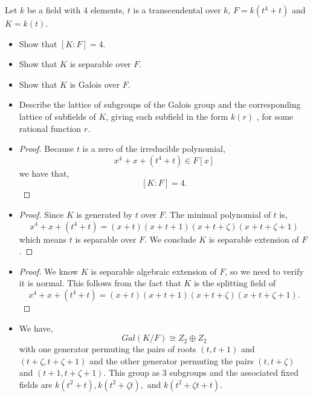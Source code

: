 \documentclass[11pt]{article}
\newenvironment{problem}[2][Problem\!]{\begin{tcolorbox}\begin{trivlist}
\item[\hskip \labelsep {\bfseries #1}\hskip \labelsep {\bfseries #2}]}{\end{trivlist}\end{tcolorbox}}
\begin{document}
\vspace*{15pt}

\begin{problem} {14.9.7}
    Let $k$ be a field with 4 elements, $t$ is a transcendental over $k$, $F = k(t^{4} + t)$ and $K = k(t)$. 
    \begin{itemize}
        \item[(a)] Show that $[K:F] = 4$.
        \item[(b)] Show that $K$ is separable over $F$.
        \item[(c)] Show that $K$ is Galois over $F$.
        \item[(d)] Describe the lattice of subgroups of the Galois group and the corresponding lattice of subfields of $K$, giving each subfield in the form $k(r)$ , for some rational function $r$.   
    \end{itemize}
\end{problem}
\begin{itemize}
    \item[(a)]
    \begin{proof}
        Because $t$ is a zero of the irreducible polynomial,
        \[x^{4} +x + (t^{4} +t)\in F[x]\]
        we have that,
        \[[K:F] = 4.\]
    \end{proof} 
    \item[(b)]
    \begin{proof}
        Since $K$ is generated by $t$ over $F$. The minimal polynomial of $t$ is,
        \[x^{4} + x + (t^{4} + t) = (x+t)(x + t + 1)(x+t + \zeta)( x+ t + \zeta + 1)\]
        which means $t$ is separable over $F$. We conclude $K$ is separable extension of $F$. 
    \end{proof} 
    \item[(c)]
    \begin{proof}
        We know $K$ is separable algebraic extension of $F$, so we need to verify it is normal. This follows from the fact that $K$ is the splitting field of 
        \[x^{4} + x + (t^{4} + t) = (x + t)(x + t + 1)(x + t + \zeta)(x + t + \zeta + 1).\]
    \end{proof} 
    \item[(d)]
    We have,
    \[Gal(K/F)\cong Z_2 \oplus Z_2\]
    with one generator permuting the pairs of roots $(t,t+1)$ and $(t + \zeta, t + \zeta + 1)$ and the other generator permuting the pairs $(t , t + \zeta)$ and $(t + 1, t + \zeta + 1)$. This group as 3 subgroups and the associated fixed fields are $k(t^{2}+t), k(t^{2}+\zeta t),$ and $k(t^{2}+ \zeta t + t).$  
\end{itemize}
\end{document}
